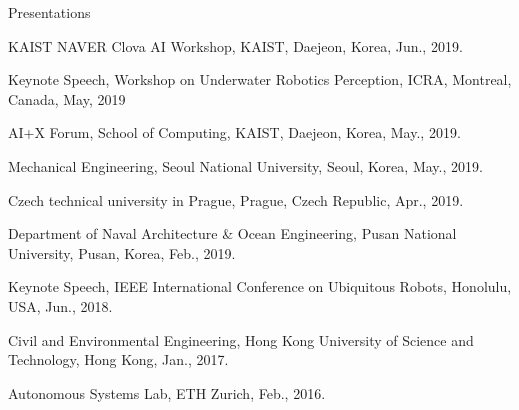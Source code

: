 \begin{rSection}{Presentations}

\begin{pubSubsectionNum}{}
  \item KAIST NAVER Clova AI Workshop, KAIST, Daejeon, Korea, Jun., 2019.

  \item Keynote Speech, Workshop on Underwater Robotics Perception, ICRA, Montreal, Canada, May, 2019

  \item AI+X Forum, School of Computing, KAIST, Daejeon, Korea, May., 2019.


  \item Mechanical Engineering, Seoul National University, Seoul, Korea, May., 2019.

  \item Czech technical university in Prague, Prague, Czech Republic, Apr., 2019.

  \item Department of Naval Architecture \& Ocean Engineering, Pusan National University, Pusan, Korea, Feb., 2019.

  \item Keynote Speech, IEEE International Conference on Ubiquitous Robots, Honolulu, USA, Jun., 2018.


  \item Civil and Environmental Engineering, Hong Kong University of Science and Technology, Hong Kong, Jan., 2017.




  \item Autonomous Systems Lab, ETH Zurich, Feb., 2016.


\end{pubSubsectionNum}
\end{rSection}
